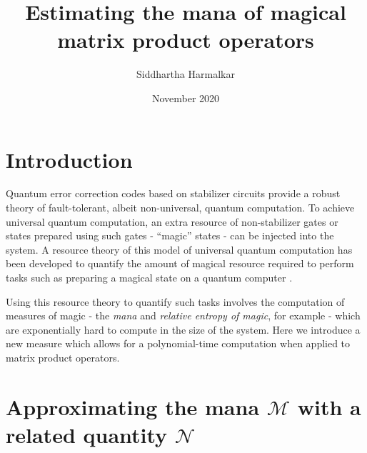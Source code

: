 \documentclass{article}
\title{Estimating the mana of magical matrix product operators}
\author{Siddhartha Harmalkar}
\date{November 2020}
\begin{document}
\maketitle

\tableofcontents

\section{Introduction}

Quantum error correction codes based on stabilizer circuits provide a robust theory of fault-tolerant, albeit non-universal, quantum computation. To achieve universal quantum computation, an extra resource of non-stabilizer gates or states prepared using such gates - ``magic'' states - can be injected into the system. A resource theory of this model of universal quantum computation has been developed to quantify the amount of magical resource required to perform tasks such as preparing a magical state on a quantum computer \cite{Veitch_2014}. 

Using this resource theory to quantify such tasks involves the computation of measures of magic - the \textit{mana} and \textit{relative entropy of magic}, for example \cite{Veitch_2014} - which are exponentially hard to compute in the size of the system. Here we introduce a new measure which allows for a polynomial-time computation when applied to matrix product operators.


\section{Approximating the mana $\mathcal M$ with a related quantity $\mathcal N$}
\end{document}
